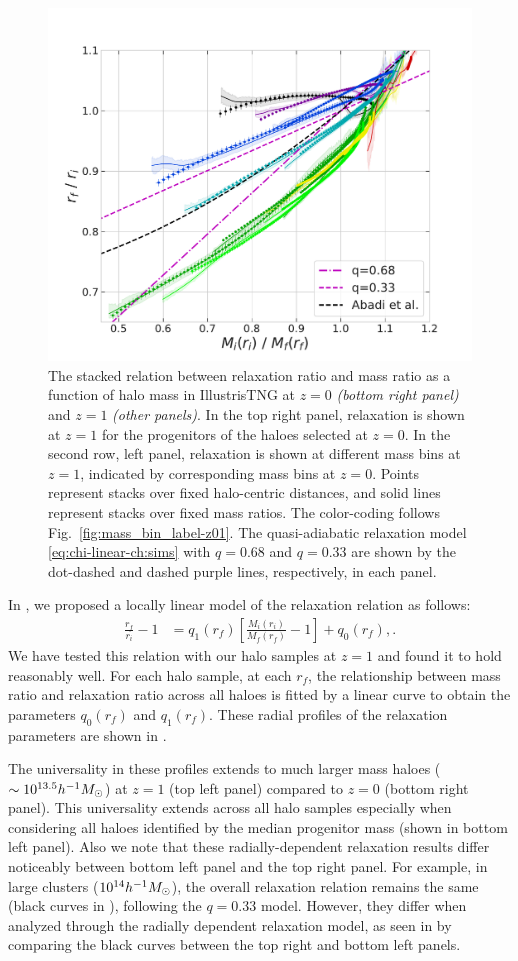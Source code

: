 \begin{figure}
\includegraphics[width=0.48\linewidth]{plots/fit_view_M_T_snap098.pdf}
\caption{The stacked relation between relaxation ratio and mass ratio as a function of halo mass in IllustrisTNG at $z=0$ \emph{(bottom right panel)} and $z=1$ \emph{(other panels)}. In the top right panel, relaxation is shown at $z=1$ for the progenitors of the haloes selected at $z=0$. In the second row, left panel, relaxation is shown at different mass bins at $z=1$, indicated by corresponding mass bins at $z=0$. Points represent stacks over fixed halo-centric distances, and solid lines represent stacks over fixed mass ratios. The color-coding follows Fig.~\ref{fig:mass_bin_label-z01}. The quasi-adiabatic relaxation model \eqref{eq:chi-linear-ch:sims} with $q=0.68$ and $q=0.33$ are shown by the dot-dashed and dashed purple lines, respectively, in each panel.}
\label{fig:fit-view-mass-indep}
\end{figure}

In , we proposed a locally linear model of the relaxation relation as follows:
\begin{align}
\label{eq:chi-linear-q0-ch:physvar}
\frac{r_f}{r_i} - 1 &= q_1(r_f) \left[ \frac{M_i(r_i)}{M_f(r_f)} - 1 \right] + q_0(r_f),.
\end{align}
We have tested this relation with our halo samples at $z=1$ and found it to hold reasonably well. For each halo sample, at each $r_f$, the relationship between mass ratio and relaxation ratio across all haloes is fitted by a linear curve to obtain the parameters $q_0(r_f)$ and $q_1(r_f)$. These radial profiles of the relaxation parameters are shown in .

The universality in these profiles extends to much larger mass haloes ($\sim 10^{13.5} h^{-1}M_{\odot}$) at $z=1$ (top left panel) compared to $z=0$ (bottom right panel). This universality extends across all halo samples especially when considering all haloes identified by the median progenitor mass (shown in bottom left panel). Also we note that these radially-dependent relaxation results differ noticeably between bottom left panel and the top right panel. For example, in large clusters ($10^{14} h^{-1}M_{\odot}$), the overall relaxation relation remains the same (black curves in ), following the $q=0.33$ model. However, they differ when analyzed through the radially dependent relaxation model, as seen in  by comparing the black curves between the top right and bottom left panels. 

